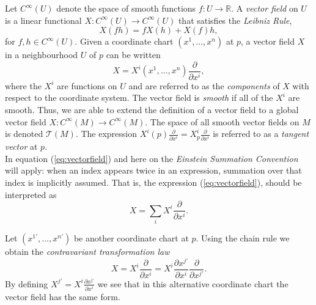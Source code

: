 Let $C^{\infty}(U)$ denote the space of smooth functions $f:U\rightarrow
\mathbb{R}$. A \textit{vector field} on $U$ is a linear functional
$X:C^{\infty}(U)\rightarrow C^{\infty}(U)$ that satisfies the \textit{Leibniz
Rule},
\[X(fh)=f X(h) + X(f)h, \]
for $f,h\in C^{\infty}(U)$. Given a coordinate chart
$(x^1,\dots,x^n)$ at $p$, a vector field $X$ in a neighbourhood $U$ of $p$ can
be written
 \begin{equation} 
 X= X^i(x^1,\dots,x^n) \frac{\partial}{\partial x^i},
\label{eq:vectorfield}
\end{equation}
where the $X^i$ are functions on $U$ and are referred to as the
\textit{components} of $X$ with respect to the coordinate system. The vector
field is \textit{smooth} if all of the $X^i$ are smooth. Thus, we are able to
extend the definition of a vector field to a global vector field
$X:C^{\infty}(M)\rightarrow C^{\infty}(M)$. The space of all smooth vector
fields on $M$ is denoted $\mathcal{T}(M)$. The expression $X^i(p)
\frac{\partial}{\partial x^i}=X^i_p \frac{\partial}{\partial x^i}$ is referred
to as a \textit{tangent vector} at $p$.\\

In equation (\ref{eq:vectorfield}) and here on the
\textit{Einstein Summation Convention} will apply: when an index appears twice
in an expression, summation over that index is implicitly assumed. That is, the
expression (\ref{eq:vectorfield}), should be interpreted as
\[  X= \sum_i X^i \frac{\partial}{\partial x^i}. \]


Let $(x^{1'},\dots,x^{n'})$ be another coordinate chart at $p$. Using the chain
rule we obtain the \textit{contravariant transformation law}
\begin{equation} X= X^i \frac{\partial}{\partial x^i}= X^i \frac{\partial
x^{j'}}{\partial x^i}\frac{\partial}{\partial x^{j'}} .\label{eq:contratp}
\end{equation}
By defining $X^{j'}=X^i \frac{\partial x^{j'}}{\partial x^i}$ we see that in
this alternative coordinate chart the vector field has the same form. \\

